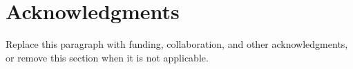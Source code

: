 \documentclass[10pt,letterpaper]{article}
\begin{document}
\maketitle
\begin{abstract}

\paperlinks
\end{abstract}

\clearpage





\section*{Acknowledgments}
Replace this paragraph with funding, collaboration, and other acknowledgments,
or remove this section when it is not applicable.


\clearpage
\appendix

\end{document}
